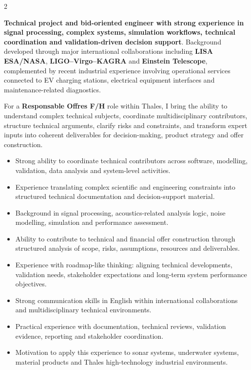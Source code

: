 \documentclass[8pt,a4paper,ragged2e,withhyper]{altacv}
\begin{document}
\begin{paracol}{2}
\switchcolumn


\textbf{Technical project and bid-oriented engineer with strong experience in signal processing, complex systems, simulation workflows, technical coordination and validation-driven decision support}. Background developed through major international collaborations including \textbf{LISA ESA/NASA}, \textbf{LIGO--Virgo--KAGRA} and \textbf{Einstein Telescope}, complemented by recent industrial experience involving operational services connected to EV charging stations, electrical equipment interfaces and maintenance-related diagnostics.

For a \textbf{Responsable Offres F/H} role within Thales, I bring the ability to understand complex technical subjects, coordinate multidisciplinary contributors, structure technical arguments, clarify risks and constraints, and transform expert inputs into coherent deliverables for decision-making, product strategy and offer construction.

\begin{itemize}
  \item Strong ability to coordinate technical contributors across software, modelling, validation, data analysis and system-level activities.
  \item Experience translating complex scientific and engineering constraints into structured technical documentation and decision-support material.
  \item Background in signal processing, acoustics-related analysis logic, noise modelling, simulation and performance assessment.
  \item Ability to contribute to technical and financial offer construction through structured analysis of scope, risks, assumptions, resources and deliverables.
  \item Experience with roadmap-like thinking: aligning technical developments, validation needs, stakeholder expectations and long-term system performance objectives.
  \item Strong communication skills in English within international collaborations and multidisciplinary technical environments.
  \item Practical experience with documentation, technical reviews, validation evidence, reporting and stakeholder coordination.
  \item Motivation to apply this experience to sonar systems, underwater systems, material products and Thales high-technology industrial environments.
\end{itemize}


\end{paracol}
\end{document}
